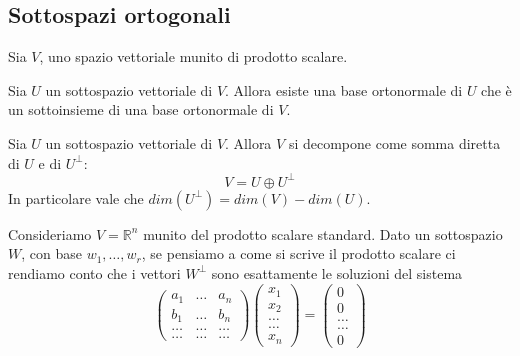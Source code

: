 
\subsection{Sottospazi ortogonali}
Sia $V$, uno spazio vettoriale munito di prodotto scalare.

\begin{proposition}
	Sia $U$ un sottospazio vettoriale di $V$. Allora esiste una base
	ortonormale di $U$ che \`e un sottoinsieme di una base ortonormale di $V$.
\end{proposition}

\begin{theorem}
	Sia $U$ un sottospazio vettoriale di $V$. Allora $V$ si decompone come
	somma diretta di $U$ e di $U^\perp$:
	\begin{equation*}
		V = U \oplus U^\perp
	\end{equation*}
	In particolare vale che $dim(U^\perp) = dim(V) - dim(U)$.
\end{theorem}

\begin{observation}
	Consideriamo $V = \mathbb{R}^n$ munito del prodotto scalare standard. Dato
	un sottospazio $W$, con base $w_1, \dots, w_r$, se pensiamo a come si
	scrive il prodotto scalare ci rendiamo conto che i vettori $W^\perp$ sono
	esattamente le soluzioni del sistema
	\begin{equation*}
		\begin{pmatrix}
			a_1   & \dots & a_n   \\
			b_1   & \dots & b_n   \\
			\dots & \dots & \dots \\
			\dots & \dots & \dots
		\end{pmatrix}
		\begin{pmatrix}
			x_1 \\ x_2 \\ \dots \\ \dots \\ x_n
		\end{pmatrix} =
		\begin{pmatrix}
			0 \\ 0 \\ \dots \\ \dots \\ 0
		\end{pmatrix}
	\end{equation*}
\end{observation}